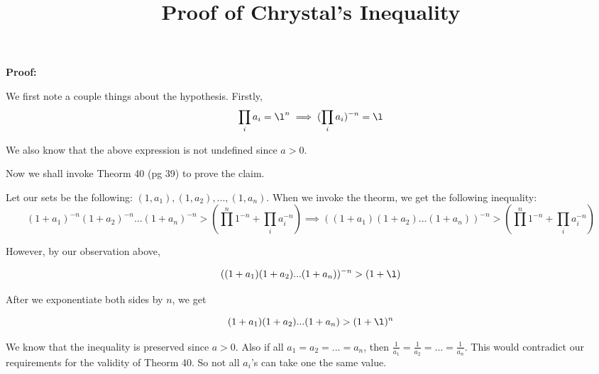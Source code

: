 \documentclass[11pt]{article}
\title{Proof of Chrystal's Inequality}
\author{\Name}
\begin{document}
\maketitle

\textbf{Proof:}

We first note a couple things about the hypothesis. Firstly, \newline
\begin{equation}
  \prod_{i} a_i = \l^n \implies (\prod_{i} a_i)^{-n} = \l 
\end{equation}


We also know that the above expression is not undefined since $a > 0$. \newline

Now we shall invoke Theorm 40 (pg 39) to prove the claim.

Let our sets be the following: $(1, a_1), (1, a_2), ... , (1, a_n)$.
When we invoke the theorm, we get the following inequality:
\begin{equation}
 (1+a_1)^{-n}(1+a_2)^{-n}...(1+a_n)^{-n} > (\prod^{n}1^{-n} + \prod_{i}a_i^{-n}) \implies
 ((1+a_1)(1+a_2)...(1+a_n))^{-n} > (\prod^{n}1^{-n} + \prod_{i}a_i^{-n})
\end{equation}

However, by our observation above,

\begin{equation}
 ((1+a_1)(1+a_2)...(1+a_n))^{-n} > (1 + \l)
\end{equation}

After we exponentiate both sides by $n$, we get

\begin{equation}
  (1+a_1)(1+a_2)...(1+a_n)> (1 + \l)^{n}
\end{equation}

We know that the inequality is preserved since $a > 0$. 
Also if all $a_1 = a_2 = ... = a_n$, then $\frac{1}{a_1} = \frac{1}{a_2} = ... = \frac{1}{a_n}$. This would contradict our requirements for the 
validity of Theorm 40. So not all $a_i$'s can take one the same value.
\end{document}
